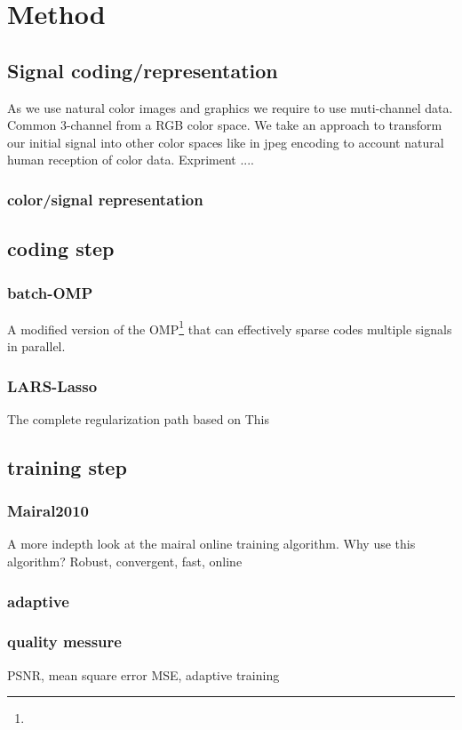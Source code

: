 \chapter{Method}


\section{Signal coding/representation}
As we use natural color images and graphics we require to use muti-channel data. Common 3-channel from a RGB color space.
We take an approach to transform our initial signal into other color spaces like in jpeg encoding to account natural human reception of
color data. 
Expriment ....
\subsection{color/signal representation}

\section{coding step}
\subsection{batch-OMP}
A modified version of the OMP\footnote{} that can effectively sparse codes multiple signals in parallel.

\subsection{LARS-Lasso}
The complete regularization path based on This \cite{lars.m}

\section{training step}
\subsection{Mairal2010}
A more indepth look at the mairal online training algorithm. 
Why use this algorithm? Robust, convergent, fast, online

\subsection{adaptive}

\subsection{quality messure}
PSNR, mean square error MSE, adaptive training 

